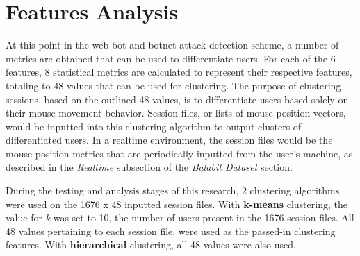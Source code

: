 \section{Features Analysis}\label{sec:features-analysis}
At this point in the web bot and botnet attack detection scheme, a number of metrics are obtained that can be used to differentiate users.
For each of the 6 features, 8 statistical metrics are calculated to represent their respective features, totaling to 48 values that can be used for clustering.
The purpose of clustering sessions, based on the outlined 48 values, is to differentiate users based solely on their mouse movement behavior.
Session files, or lists of mouse position vectors, would be inputted into this clustering algorithm to output clusters of differentiated users.
In a realtime environment, the session files would be the mouse position metrics that are periodically inputted from the user's machine, as described in the \textit{Realtime} subsection of the \textit{Balabit Dataset} section.

During the testing and analysis stages of this research, 2 clustering algorithms were used on the 1676 x 48 inputted session files.
With \textbf{k-means} clustering, the value for \textit{k} was set to 10, the number of users present in the 1676 session files. All 48 values pertaining to each session file, were used as the passed-in clustering features.
With \textbf{hierarchical} clustering, all 48 values were also used.
